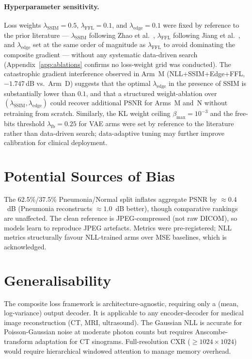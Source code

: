 \documentclass[12pt, a4paper, twoside, openright]{book}
\begin{document}
\paragraph{Hyperparameter sensitivity.} Loss weights $\lambda_{\mathrm{SSIM}} = 0.5$, $\lambda_{\mathrm{FFL}} = 0.1$, and $\lambda_{\mathrm{edge}} = 0.1$ were fixed by reference to the prior literature --- $\lambda_{\mathrm{SSIM}}$ following Zhao et al.\ \cite{zhao_loss_2017}, $\lambda_{\mathrm{FFL}}$ following Jiang et al.\ \cite{jiang_focal_2021}, and $\lambda_{\mathrm{edge}}$ set at the same order of magnitude as $\lambda_{\mathrm{FFL}}$ to avoid dominating the composite gradient --- without any systematic data-driven search (Appendix~\ref{app:ablations} confirms no loss-weight grid was conducted). The catastrophic gradient interference observed in Arm~M (NLL+SSIM+Edge+FFL, $-1.747$\,dB vs.\ Arm~D) suggests that the optimal $\lambda_{\mathrm{edge}}$ in the presence of SSIM is substantially lower than $0.1$, and that a structured weight-ablation over $(\lambda_{\mathrm{SSIM}}, \lambda_{\mathrm{edge}})$ could recover additional PSNR for Arms~M and~N without retraining from scratch. Similarly, the KL weight ceiling $\beta_{\max} = 10^{-3}$ and the free-bits threshold $\lambda_{\mathrm{fb}} = 0.25$ for VAE arms were set by reference to the literature rather than data-driven search; data-adaptive tuning may further improve calibration for clinical deployment.

\section{Potential Sources of Bias}
\label{sec:disc:bias}

The 62.5\%/37.5\% Pneumonia/Normal split inflates aggregate PSNR by $\approx 0.4$~dB (Pneumonia reconstructs $\approx 1.0$~dB better), though comparative rankings are unaffected. The clean reference is JPEG-compressed (not raw DICOM), so models learn to reproduce JPEG artefacts. Metrics were pre-registered; NLL metrics structurally favour NLL-trained arms over MSE baselines, which is acknowledged.

\section{Generalisability}
\label{sec:disc:generalisability}

The composite loss framework is architecture-agnostic, requiring only a (mean, log-variance) output decoder. It is applicable to any encoder-decoder for medical image reconstruction (CT, MRI, ultrasound). The Gaussian NLL is accurate for Poisson-Gaussian noise at moderate photon counts but requires Anscombe-transform adaptation for CT sinograms. Full-resolution CXR ($\geq 1024\times1024$) would require hierarchical windowed attention to manage memory overhead.
\end{document}
